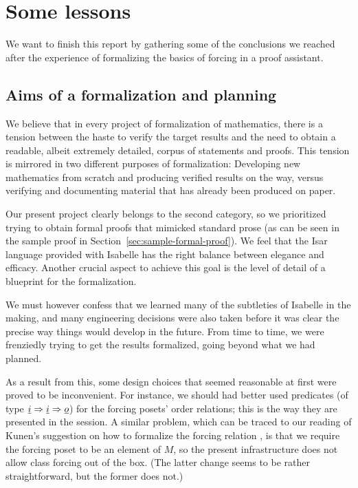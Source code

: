 \section{Some lessons}\label{sec:lessons}

We want to finish this report by gathering some of the conclusions we
reached after the experience of formalizing the basics of forcing in a
proof assistant.

\subsection{Aims of a formalization and planning}
\label{sec:aims-formalization-planning}

We believe that in every project of formalization of mathematics,
there is a tension between the haste to verify the target results and
the need to obtain a readable, albeit extremely detailed, corpus of
statements and proofs. This tension is mirrored in two different
purposes of formalization: Developing new mathematics from scratch and
producing verified results on the way, versus verifying and
documenting material that has already been produced on paper.

Our present project clearly belongs to the second category, so we
prioritized trying to obtain formal proofs that mimicked standard
prose (as can be seen in the sample proof in
Section~\ref{sec:sample-formal-proof}). We feel that the Isar language
provided with Isabelle has the right balance between elegance and
efficacy. Another crucial aspect to achieve this goal is the level of
detail of a blueprint for the formalization.

We must however confess
that we learned many of the subtleties of Isabelle in the making, and
many engineering decisions were also taken before it was clear the
precise way things would develop in the future.
From time to time, we were frenziedly trying to
get the results formalized, going beyond what we had planned.

As a result from this, some design choices that seemed reasonable at
first were proved to be inconvenient. For instance, we should had
better used predicates (of type $\tyi\fun\tyi\fun\tyo$) for the
forcing posets' order relations; this is the way they
are presented in the  session. A similar
problem, which can be traced to our reading of Kunen's suggestion on
how to formalize the forcing relation \cite[p.~260]{kunen2011set},
is that we require the forcing poset to be an element of $M$,
so the present infrastructure does not allow class forcing out of the
box. (The latter change seems to be rather straightforward, but the
former does not.)


